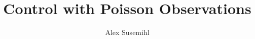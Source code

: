 \documentclass[11pt, oneside]{tufte-handout}   	%
\title{Control with Poisson Observations}
\author{Alex Susemihl}
\begin{document}
\maketitle



{}

\end{document}
